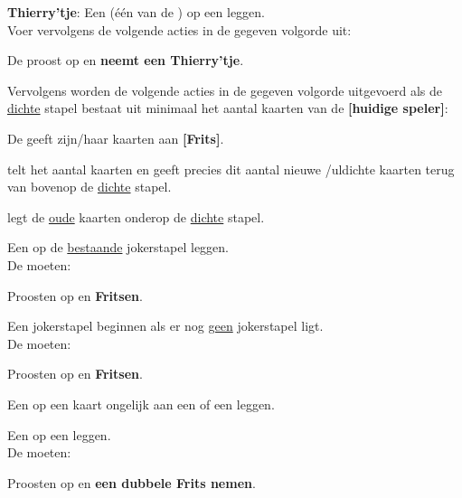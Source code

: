\vervolgLijst{}
    \item \label{zet:thierry} \textbf{Thierry'tje}: Een  (\'e\'en van de ) op een  leggen. \\Voer vervolgens de volgende acties in de gegeven volgorde uit:
    \puntLijst{}
        \item De \huidigeSpeler proost op  en \textbf{neemt een Thierry'tje}\footnotemark[2].
        \item Vervolgens worden de volgende acties in de gegeven volgorde uitgevoerd als de \ul{dichte} stapel bestaat uit minimaal het aantal kaarten van de \textbf{[huidige speler]}:
        \puntLijst{}
            \item De \huidigeSpeler geeft zijn/haar kaarten aan \textbf{[Frits]}. \
            \item \Frits telt het aantal kaarten en geeft precies dit aantal nieuwe /ul{dichte} kaarten terug van bovenop de \ul{dichte} stapel. 
            \item \Frits legt de \ul{oude} kaarten onderop de \ul{dichte} stapel.
        \eindPuntLijst{}
    \eindPuntLijst{}
    \label{zet:thierry}
\eindLijst{} 

\vervolgLijst{}
    \item \label{zet:joker_1} Een  op de \ul{bestaande} jokerstapel leggen. \\De \andereSpelers moeten:
    \puntLijst{}
        \item Proosten op  en \textbf{Fritsen}.
    \eindPuntLijst{}
\eindLijst{} 

\vervolgLijst{}
    \item \label{zet:joker_2} Een jokerstapel beginnen als er nog \ul{geen} jokerstapel ligt. \\De \andereSpelers moeten:
    \puntLijst{}
        \item Proosten op  en \textbf{Fritsen}.
    \eindPuntLijst{}
\eindLijst{} 

\vervolgLijst{}
    \item Een  op een kaart ongelijk aan een  of een  leggen.
\eindLijst{} 

\vervolgLijst{}
    \item Een  op een  leggen. \\De \andereSpelers moeten:
    \puntLijst{}
        \item Proosten op  en \textbf{een dubbele Frits nemen}.
    \eindPuntLijst{}
\eindLijst{} 




